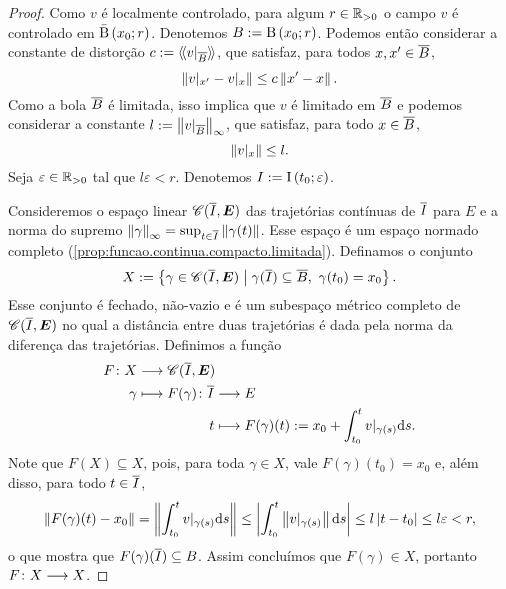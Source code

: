 \begin{proof}
Como $v$ é localmente controlado, para algum $r \in \mathbb{R}_{>0}$ o campo $v$ é controlado em $\bar{\mathrm{B}}\left(x_0; r\right)$. Denotemos $B := \mathrm{B}\left(x_0; r\right)$. Podemos então considerar a constante de distorção $c := \langle\!\langle{v|_{\overline{B}}}\rangle\!\rangle$, que satisfaz, para todos $x, x' \in \overline{B}$,
	\begin{equation*}
	\left\Vert{v|_{x'} - v|_x}\right\Vert \leq c\left\Vert{x'-x}\right\Vert.
	\end{equation*}
Como a bola $\overline{B}$ é limitada, isso implica que $v$ é limitado em $\overline{B}$ e podemos considerar a constante $l := \left\Vert{v|_{\overline{B}}}\right\Vert_{\infty}$, que satisfaz, para todo $x \in \overline{B}$,
	\begin{equation*}
	\left\Vert{v|_x}\right\Vert \leq l.
	\end{equation*}
Seja $\varepsilon \in \mathbb{R}_{>0}$ tal que $l\varepsilon < r$. Denotemos $I := \mathrm{I}\left(t_0; \varepsilon\right)$.

Consideremos o espaço linear $\mathscr{C}(\overline{I}, \bm E)$ das trajetórias contínuas de $\overline{I}$ para $E$ e a norma do supremo $\left\Vert{\gamma}\right\Vert_{\infty} = \sup_{t \in \overline{I}} \left\Vert{\gamma(t)}\right\Vert$. Esse espaço é um espaço normado completo (\ref{prop:funcao.continua.compacto.limitada}). Definamos o conjunto
	\begin{equation*}
	X := \left\{ \gamma \in \mathscr{C}(\overline{I}, \bm E) \;\middle\vert\; \gamma(\overline{I}) \subseteq \overline{B},\ \gamma(t_0) = x_0 \right\}.
	\end{equation*}
Esse conjunto é fechado, não-vazio e é um subespaço métrico completo de $\mathscr{C}(\overline{I}, \bm E)$ no qual a distância entre duas trajetórias é dada pela norma da diferença das trajetórias. Definimos a função
	\begin{align*}
	\func{F}{X}{\Cont(\Fec{I}, \bm E)}{\gamma}{
		\begin{aligned}[t]
		\func{F(\gamma)}{\Fec{I}}{E}{t}{F(\gamma)(t) := x_0 + \int_{t_0}^{t} v|_{\gamma(s)} \dd s}.
		\end{aligned}
	}
	\end{align*}
Note que $F(X) \subseteq X$, pois, para toda $\gamma \in X$, vale $F(\gamma)(t_0) = x_0$ e, além disso, para todo $t \in \overline{I}$,
	\begin{equation*}
	\left\Vert{F(\gamma)(t) - x_0}\right\Vert = \left\Vert{\int_{t_0}^{t} v|_{\gamma(s)} \mathrm{d}s}\right\Vert \leq \left\vert{\int_{t_0}^{t} \left\Vert{v|_{\gamma(s)}}\right\Vert \mathrm{d}s}\right\vert \leq l\left\vert{t-t_0}\right\vert \leq l\varepsilon < r,
	\end{equation*}
o que mostra que $F(\gamma)(\overline{I}) \subseteq B$. Assim concluímos que $F(\gamma) \in X$, portanto $F\colon \allowbreak X \longrightarrow X$.


\end{proof}
